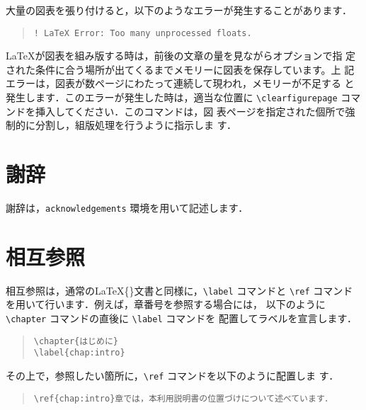 \documentclass[
  sotsuron]{kuee}
\begin{document}
大量の図表を張り付けると，以下のようなエラーが発生することがあります．

\begin{quote}
  \begin{verbatim}
! LaTeX Error: Too many unprocessed floats.
\end{verbatim}
\end{quote}

\LaTeX が図表を組み版する時は，前後の文章の量を見ながらオプションで指
定された条件に合う場所が出てくるまでメモリーに図表を保存しています。上
記エラーは，図表が数ページにわたって連続して現われ，メモリーが不足する
と発生します．このエラーが発生した時は，適当な位置に
\verb+\clearfigurepage+ コマンドを挿入してください．このコマンドは，図
表ページを指定された個所で強制的に分割し，組版処理を行うように指示しま
す．

\hypertarget{ux8b1dux8f9e}{%
\section{謝辞}\label{ux8b1dux8f9e}}

謝辞は，\verb+acknowledgements+ 環境を用いて記述します．

\hypertarget{ux76f8ux4e92ux53c2ux7167}{%
\section{相互参照}\label{ux76f8ux4e92ux53c2ux7167}}

\label{cross_reference}
相互参照は，通常の\LaTeX\{\}文書と同様に，\verb+\label+ コマンドと
\verb+\ref+ コマンドを用いて行います．例えば，章番号を参照する場合には，
以下のように \verb+\chapter+ コマンドの直後に \verb+\label+ コマンドを
配置してラベルを宣言します．

\begin{quote}
  \begin{verbatim}
\chapter{はじめに}
\label{chap:intro}
\end{verbatim}
\end{quote}

その上で，参照したい箇所に，\verb+\ref+ コマンドを以下のように配置しま
す．

\begin{quote}
  \begin{verbatim}
\ref{chap:intro}章では，本利用説明書の位置づけについて述べています．
\end{verbatim}
\end{quote}
\end{document}
